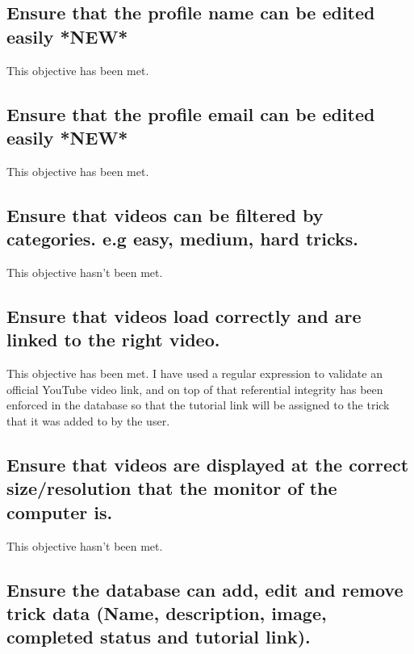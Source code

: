 \subsection {Ensure that the profile name can be edited easily *NEW*} %

This objective has been met.




\subsection {Ensure that the profile email can be edited easily *NEW*} %

This objective has been met.




\subsection {Ensure that videos can be filtered by categories. e.g easy, medium, hard tricks.}

This objective hasn't been met.




\subsection {Ensure that videos load correctly and are linked to the right video.}

This objective has been met. I have used a regular expression to validate an official YouTube video link, and on top of that referential integrity has been enforced in the database so that the tutorial link will be assigned to the trick that it was added to by the user. 




\subsection {Ensure that videos are displayed at the correct size/resolution that the monitor of the computer is.}

This objective hasn't been met.



\subsection {Ensure the database can add, edit and remove trick data (Name, description, image, completed status and tutorial link).}

